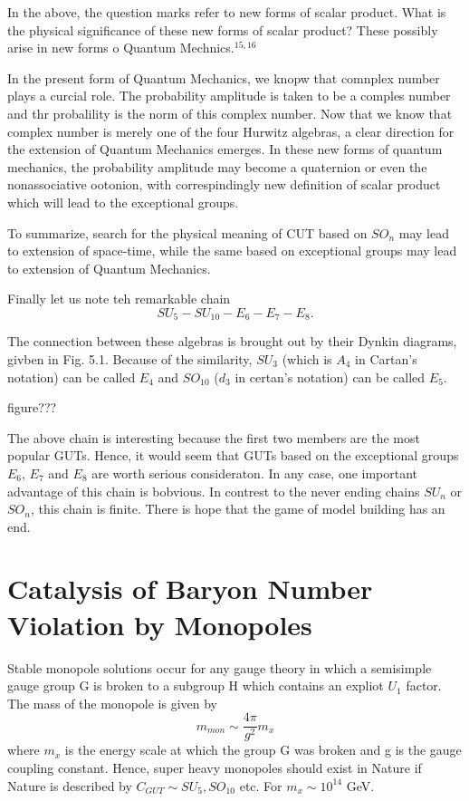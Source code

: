 In the above, the question marks refer to new forms of scalar product. What is the physical significance of these new forms of scalar product? These possibly arise in new forms o Quantum Mechnics.$^{15, 16}$

In the present form of Quantum Mechanics, we knopw that comnplex number plays a curcial role. The probability amplitude is taken to be a comples number and thr probalility is the norm of this complex number. Now that we know that complex number is merely one of the four Hurwitz algebras, a  clear direction for the extension of Quantum Mechanics emerges. In these new forms of quantum mechanics, the probability amplitude may become a quaternion or even the nonassociative ootonion, with correspindingly new definition of scalar product which will lead to the exceptional groups.

To summarize, search for the physical meaning of CUT based on $SO_{n}$ may lead to extension of space-time, while the same based on exceptional groups may lead to extension of Quantum Mechanics.

Finally let us note teh remarkable chain
$$
SU_{5} - SU_{10}-E_{6}-E_{7}-E_{8}.
$$

The connection between these algebras is brought out by their Dynkin diagrams, givben in Fig. 5.1. Because of the similarity, $SU_{3}$ (which is $A_{4}$ in Cartan's notation) can be called $E_{4}$ and $SO_{10}$ ($d_{3}$ in certan's notation) can be called $E_{5}$.

figure???

The above chain is interesting because the first two members are the most popular GUTs. Hence, it would seem that GUTs based on the exceptional groups $E_{6}$, $E_{7}$ and $E_{8}$ are worth serious consideraton. In any case, one important advantage of this chain is bobvious. In contrest to the never ending chains $SU_{n}$ or $SO_{n}$, this chain is finite. There is hope that the game of model building has an end.

\section{Catalysis of Baryon Number Violation by Monopoles}

Stable monopole solutions occur for any gauge theory in which a semisimple gauge group G  is broken to a subgroup H which contains an expliot $U_{1}$ factor. The mass of the monopole is given by
$$
m_{mon} \sim \frac{4\pi}{g^{2}} m_{x}
$$
where $m_{x}$ is the energy scale at which the group G was broken and g is the gauge coupling constant. Hence, super heavy monopoles should exist in Nature if Nature is described by $C_{GUT} \sim SU_{5}, SO_{10}$ etc. For $m_{x} \sim 10^{14}$ GeV.

